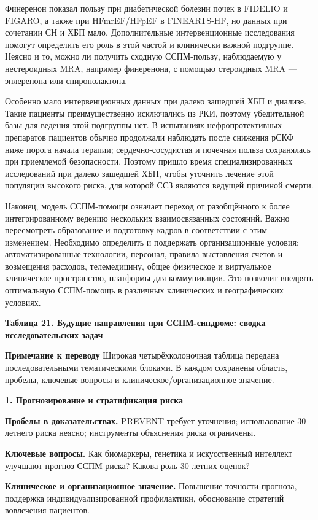 \documentclass[11pt,a4paper]{article}
\newcommand{\editorial}[1]{\par\begingroup\small\color{black!70}\textbf{Примечание к переводу} #1\par\endgroup}
\newcommand{\heading}[1]{\par\medskip\textbf{#1}\par}
\begin{document}
Финеренон показал пользу при диабетической болезни почек в FIDELIO и FIGARO, а также при HFmrEF/HFpEF в FINEARTS-HF, но данных при сочетании СН и ХБП мало. Дополнительные интервенционные исследования помогут определить его роль в этой частой и клинически важной подгруппе. Неясно и то, можно ли получить сходную ССПМ-пользу, наблюдаемую у нестероидных MRA, например финеренона, с помощью стероидных MRA --- эплеренона или спиронолактона.

Особенно мало интервенционных данных при далеко зашедшей ХБП и диализе. Такие пациенты преимущественно исключались из РКИ, поэтому убедительной базы для ведения этой подгруппы нет. В испытаниях нефропротективных препаратов пациентов обычно продолжали наблюдать после снижения рСКФ ниже порога начала терапии; сердечно-сосудистая и почечная польза сохранялась при приемлемой безопасности. Поэтому пришло время специализированных исследований при далеко зашедшей ХБП, чтобы уточнить лечение этой популяции высокого риска, для которой ССЗ являются ведущей причиной смерти.

Наконец, модель ССПМ-помощи означает переход от разобщённого к более интегрированному ведению нескольких взаимосвязанных состояний. Важно пересмотреть образование и подготовку кадров в соответствии с этим изменением. Необходимо определить и поддержать организационные условия: автоматизированные технологии, персонал, правила выставления счетов и возмещения расходов, телемедицину, общее физическое и виртуальное клиническое пространство, платформы для коммуникации. Это позволит внедрять оптимальную ССПМ-помощь в различных клинических и географических условиях.

\heading{Таблица 21. Будущие направления при ССПМ-синдроме: сводка исследовательских задач}
\editorial{Широкая четырёхколоночная таблица передана последовательными тематическими блоками. В каждом сохранены область, пробелы, ключевые вопросы и клиническое/организационное значение.}

\heading{1. Прогнозирование и стратификация риска}
\textbf{Пробелы в доказательствах.} PREVENT требует уточнения; использование 30-летнего риска неясно; инструменты объяснения риска ограничены.

\textbf{Ключевые вопросы.} Как биомаркеры, генетика и искусственный интеллект улучшают прогноз ССПМ-риска? Какова роль 30-летних оценок?

\textbf{Клиническое и организационное значение.} Повышение точности прогноза, поддержка индивидуализированной профилактики, обоснование стратегий вовлечения пациентов.
\end{document}
